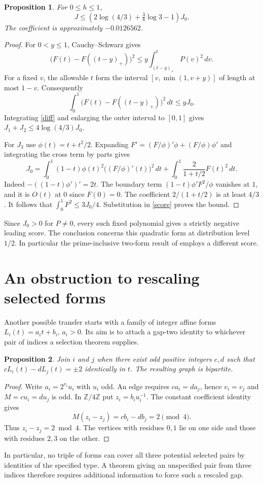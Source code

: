 \documentclass[11pt]{article}
\newtheorem{proposition}{Proposition}
\begin{document}
\begin{proposition}
For $0\le h\le1$,
\[
 J\le\left(2\log(4/3)+\tfrac38\log 3-1\right)J_0.
\]
The coefficient is approximately $-0.0126562$.
\end{proposition}
\begin{proof}
For $0<y\le1$, Cauchy--Schwarz gives
\[
 \bigl(F(t)-F((t-y)_+)\bigr)^2
       \le y\int_{(t-y)_+}^t P(v)^2\,dv.
\]
For a fixed $v$, the allowable $t$ form the interval
$[v,\min(1,v+y)]$ of length at most $1-v$. Consequently
\[
 \int_0^1\bigl(F(t)-F((t-y)_+)\bigr)^2\,dt\le yJ_0 .
\]
Integrating \eqref{diff} and enlarging the outer interval to $[0,1]$
gives $J_1+J_2\le 4\log(4/3)J_0$.

For $J_3$ use $\phi(t)=t+t^2/2$. Expanding
$F'=(F/\phi)'\phi+(F/\phi)\phi'$ and integrating the cross term
by parts gives
\[
 J_0=\int_0^1(1-t)\phi(t)^2\bigl((F/\phi)'(t)\bigr)^2\,dt
      +\int_0^1 \frac{2}{1+t/2}F(t)^2\,dt .
\]
Indeed $-((1-t)\phi')'=2t$. The boundary term
$(1-t)\phi'F^2/\phi$ vanishes at $1$, and it is $O(t)$ at $0$
since $F(0)=0$. The coefficient $2/(1+t/2)$ is at least $4/3$.
It follows that $\int_0^1F^2\le 3J_0/4$. Substitution in
\eqref{score} proves the bound.
\end{proof}
Since $J_0>0$ for $P\ne0$, every such fixed polynomial gives a
strictly negative leading score. The conclusion concerns this
quadratic form at distribution level $1/2$. In particular the
prime-inclusive two-form result of \cite[Theorem~3]{GGPY} employs
a different score.

\section{An obstruction to rescaling selected forms}
Another possible transfer starts with a family of
integer affine forms $L_i(t)=a_it+b_i$, $a_i>0$. Its aim is to
attach a gap-two identity to whichever pair of indices a selection
theorem supplies.
\begin{proposition}
Join $i$ and $j$ when there exist odd positive integers $c,d$
such that $cL_i(t)-dL_j(t)=\pm2$ identically in $t$. The resulting
graph is bipartite.
\end{proposition}
\begin{proof}
Write $a_i=2^{v_i}u_i$ with $u_i$ odd. An edge requires
$ca_i=da_j$, hence $v_i=v_j$ and $M=cu_i=du_j$ is odd.
In $\mathbb Z/4\mathbb Z$ put $z_i=b_i u_i^{-1}$. The constant
coefficient identity gives
\[
 M(z_i-z_j)=cb_i-db_j=2 \pmod4.
\]
Thus $z_i-z_j=2\bmod4$. The vertices with residues $0,1$ lie
on one side and those with residues $2,3$ on the other.
\end{proof}
In particular, no triple of forms can cover all three potential
selected pairs by identities of the specified type. A theorem
giving an unspecified pair from three indices therefore requires
additional information to force such a rescaled gap.
\end{document}
